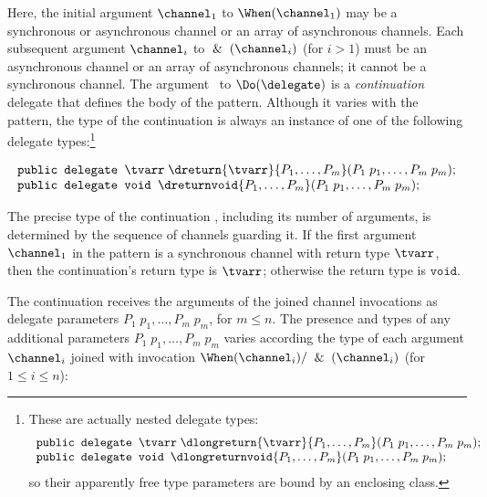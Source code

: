 Here, the initial argument $\channel_1$ to $\When(\channel_1)$ may be a synchronous or asynchronous channel or an array of asynchronous channels.
Each subsequent argument  $\channel_i$ to $\And(\channel_i)$ (for $i>1$)  must be an asynchronous channel or an array of asynchronous channels; 
it cannot be a synchronous channel. The argument \delegate\ to $\Do(\delegate)$ is a \emph{continuation} delegate that defines the body of the pattern.
Although it varies with the pattern,  the type of the continuation is always an instance of one of the following delegate types:\footnote{
These are actually nested delegate types:
\[ 
\begin{array}{l}
  \texttt{public delegate } \tvarr\; \dlongreturn{\tvarr}{P_1,\ldots,P_m}(P_1\;p_1, \ldots,  P_m\;p_m );\\
  \texttt{public delegate void } \dlongreturnvoid{P_1,\ldots,P_m}(P_1\;p_1, \ldots,  P_m\;p_m );\\
\end{array}
\]
so their apparently free type parameters are bound by an enclosing class.}

\[ 
\begin{array}{l}
  \texttt{public delegate } \tvarr\; \dreturn{\tvarr}{P_1,\ldots,P_m}(P_1\;p_1, \ldots,  P_m\;p_m );\\
  \texttt{public delegate void } \dreturnvoid{P_1,\ldots,P_m}(P_1\;p_1, \ldots,  P_m\;p_m );\\
\end{array}
\]

The precise type of the continuation \delegate, including its number of arguments, is determined by the sequence of channels guarding it.
If the first argument $\channel_1$ in the pattern is a synchronous  channel with return type $\tvarr$, then
the continuation's return type is $\tvarr$; otherwise the return type is $\texttt{void}$.


The continuation receives the arguments of the joined channel invocations 
as delegate parameters $P_1\;p_1, \ldots,  P_m\;p_m$, for $m\leq n$.
The presence and types of any additional parameters $P_1\;p_1, \ldots,  P_m\;p_m$
varies according the type of each argument $\channel_i$ joined with 
invocation $\When(\channel_i)/\And(\channel_i)$ (for $1\leq i\leq n$):

